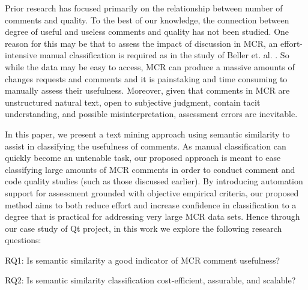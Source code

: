 Prior research has focused primarily on the relationship between number of comments and quality.
To the best of our knowledge, the connection between degree of useful and useless comments and quality has not been studied.
One reason for this may be that to assess the impact of discussion in MCR, an effort-intensive manual classification is required as in the study of Beller et. al. \cite{Beller}.
So while the data may be easy to access, MCR can produce a massive amounts of changes requests and comments\cite{Balachandran2013,Thongtanunam2014} and it is painstaking and time consuming to manually assess their usefulness.
Moreover, given that comments in MCR are unstructured natural text, open to subjective judgment, contain tacit understanding, and possible misinterpretation, assessment errors are inevitable. 







In this paper, we present a text mining approach using semantic similarity to assist in classifying the usefulness of comments.
As manual classification can quickly become an untenable task, our proposed approach is meant to ease classifying large amounts of MCR comments in order to conduct comment and code quality studies (such as those discussed earlier).
By introducing automation support for assessment grounded with objective empirical criteria, our proposed method aims to both reduce effort and increase confidence in classification to a degree that is practical for addressing very large MCR data sets.
Hence through our case study of Qt project, in this work we explore the following research questions:
\begin{ResearchQuestions}
\item[RQ1:] Is semantic similarity a good indicator of MCR comment usefulness?\\
\item[RQ2:] Is semantic similarity classification cost-efficient, assurable, and scalable?
\end{ResearchQuestions}


